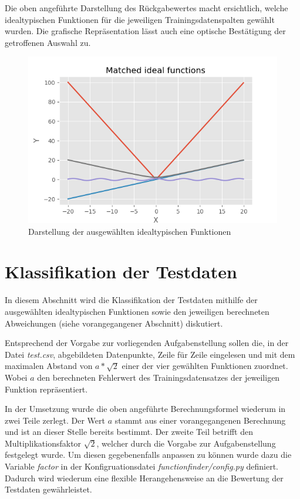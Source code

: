 Die oben angeführte Darstellung des Rückgabewertes macht ersichtlich, welche idealtypischen Funktionen für die jeweiligen Trainingsdatenspalten gewählt wurden. Die grafische Repräsentation lässt auch eine optische Bestätigung der getroffenen Auswahl zu.

\begin{figure}[h]
\centering
\includegraphics[width=13cm]{../output/figures/ideal.png}
\caption{Darstellung der ausgewählten idealtypischen Funktionen \cite{Gage:18}}
\label{fig:ideal}
\end{figure}

\section{Klassifikation der Testdaten}

In diesem Abschnitt wird die Klassifikation der Testdaten mithilfe der ausgewählten idealtypischen Funktionen sowie den jeweiligen berechneten Abweichungen (siehe vorangegangener Abschnitt) diskutiert.

Entsprechend der Vorgabe zur vorliegenden Aufgabenstellung sollen die, in der Datei \emph{test.csv}, abgebildeten Datenpunkte, Zeile für Zeile eingelesen und mit dem maximalen Abstand von $ a*\sqrt{2}$ einer der vier gewählten Funktionen zuordnet. Wobei $a$ den berechneten Fehlerwert des Trainingsdatensatzes der jeweiligen Funktion repräsentiert.

In der Umsetzung wurde die oben angeführte Berechnungsformel wiederum in zwei Teile zerlegt. Der Wert $a$ stammt aus einer vorangegangenen Berechnung und ist an dieser Stelle bereits bestimmt. Der zweite Teil betrifft den Multiplikationsfaktor $\sqrt{2}$, welcher durch die Vorgabe zur Aufgabenstellung festgelegt wurde. Um diesen gegebenenfalls anpassen zu können wurde dazu die Variable \emph{factor} in der Konfigruationsdatei \emph{functionfinder/config.py} definiert. Dadurch wird wiederum eine flexible Herangehensweise an die Bewertung der Testdaten gewährleistet.

